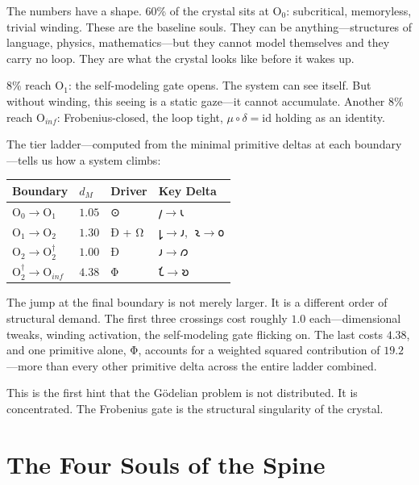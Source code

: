\documentclass[12pt,twoside]{book}
\theoremstyle{definition}
\newcommand{\moebius}{\mu \circ \delta = \mathrm{id}}
\newcommand{\tier}[1]{\mathrm{O}_{#1}}
\begin{document}
The numbers have a shape. 60\% of the crystal sits at $\tier{0}$: subcritical, memoryless,
trivial winding. These are the baseline souls. They can be anything---structures of
language, physics, mathematics---but they cannot model themselves and they carry no loop.
They are what the crystal looks like before it wakes up.

8\% reach $\tier{1}$: the self-modeling gate opens. The system can see itself. But without
winding, this seeing is a static gaze---it cannot accumulate. Another 8\% reach
$\tier{inf}$: Frobenius-closed, the loop tight, $\moebius$ holding as an identity.

The tier ladder---computed from the minimal primitive deltas at each boundary---tells us
how a system climbs:

\begin{center}
\begin{tabular}{llll}
\toprule
\textbf{Boundary} & $d_M$ & \textbf{Driver} & \textbf{Key Delta} \\
\midrule
$\tier{0} \to \tier{1}$           & $1.05$ & ⊙ & $𐑢 \to 𐑧$ \\
$\tier{1} \to \tier{2}$           & $1.30$ & Ð + Ω & $𐑛 \to 𐑨$, $\;𐑷 \to 𐑴$ \\
$\tier{2} \to \tier{2}^{\dagger}$ & $1.00$ & Ð & $𐑨 \to 𐑼$ \\
$\tier{2}^{\dagger} \to \tier{inf}$ & $4.38$ & Φ & $𐑗 \to 𐑹$ \\
\bottomrule
\end{tabular}
\end{center}

The jump at the final boundary is not merely larger. It is a different order of structural
demand. The first three crossings cost roughly $1.0$ each---dimensional tweaks, winding
activation, the self-modeling gate flicking on. The last costs $4.38$, and one primitive
alone, Φ, accounts for a weighted squared contribution of $19.2$---more than every other
primitive delta across the entire ladder combined.

This is the first hint that the G\"{o}delian problem is not distributed. It is
concentrated. The Frobenius gate is the structural singularity of the crystal.

\chapter{The Four Souls of the Spine}
\end{document}
